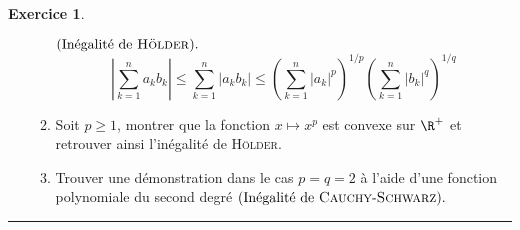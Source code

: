 \documentclass[a4paper,11pt]{article}
\theoremstyle{definition}
\newtheorem{exo}{Exercice} %
\begin{document}
\begin{minipage}{1\linewidth}
\begin{minipage}[t]{0.48\linewidth}
\begin{exo}
\begin{enumerate}
\begin{enumerate}
					$(\mbox{Inégalité de \textsc{Hölder}}).$\quad\\[-0.8cm]
					
					$$\left|\sum_{k=1}^{n}a_kb_k\right|\leq\sum_{k=1}^{n}|a_kb_k|\leq\left(\sum_{k=1}^{n}|a_k|^p\right)^{1/p}\left(\sum_{k=1}^{n}|b_k|^q\right)^{1/q}$$
					
					\item Soit $p\geq1$, montrer que la fonction $x\mapsto x^p$ est convexe sur $\R^+$ et retrouver ainsi l'inégalité de \textsc{Hölder}.
					\item Trouver une démonstration dans le cas $p=q=2$ à l'aide d'une fonction polynomiale du second degré
					$(\mbox{Inégalité de \textsc{Cauchy}-\textsc{Schwarz}}).$ 
			
				\end{enumerate}
			\end{enumerate}
		
			\centering
			\rule{1\linewidth}{0.6pt}
		\end{exo}

		
		
	\end{minipage}
\end{minipage}
	
\end{document}
